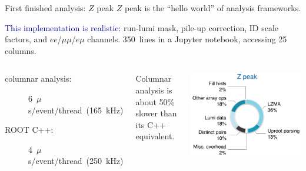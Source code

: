 \documentclass[aspectratio=169]{beamer}
\begin{document}
\begin{frame}[fragile]{First finished analysis: $Z$ peak}
\vspace{0.5 cm}
$Z$ peak is the ``hello world'' of analysis frameworks.

\vspace{0.5 cm}
\textcolor{darkblue}{This implementation is realistic:} run-lumi mask, pile-up correction, ID scale factors, and $ee$/$\mu\mu$/$e\mu$ channels. 350~lines in a Jupyter notebook, accessing 25 columns.

\vspace{0.25 cm}
\begin{columns}
\large
\begin{description}
\item[columnar analysis:] \hfill \mbox{\hspace{-1 cm}6~$\mu$s/event/thread (165~kHz)}
\item[ROOT C++:] \hfill \mbox{\hspace{-1 cm}4~$\mu$s/event/thread (250~kHz)}
\end{description}

\vspace{0.25 cm}
Columnar analysis is about 50\% slower than its C++ equivalent.

\includegraphics[width=\linewidth]{zpeak-performance-breakdown.png}
\end{columns}
\end{frame}
\end{document}
